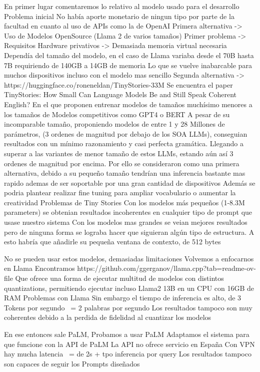 En primer lugar comentaremos lo relativo al modelo usado para el desarrollo
	Problema inicial
	No había aporte monetario de ningun tipo por parte de la facultad en cuanto al uso de APIs como la de OpenAI
	Primera alternativa -> Uso de Modelos OpenSource (Llama 2 de varios tamaños)
	Primer problema -> Requisitos Hardware privativos -> Demasiada memoria virtual necesaria
		Dependía del tamaño del modelo, en el caso de Llama variaba desde el 70B hasta 7B requiriendo de 140GB a 14GB de memoria 
		Lo que se vuelve inabarcable para muchos dispositivos incluso con el modelo mas sencillo
	Segunda alternativa -> https://huggingface.co/roneneldan/TinyStories-33M
		Se encuentra el paper TinyStories: How Small Can Language Models Be and Still Speak Coherent English?
		En el que proponen entrenar modelos de tamaños muchísimo menores a los tamaños de Modelos competitivos como GPT4 o BERT
		A pesar de su incomparable tamaño, proponiendo modelos de entre 1 y 28 Millones de parámetros, (3 ordenes de magnitud por debajo de los SOA LLMs), conseguian resultados con un mínimo razonamiento y casi perfecta gramática. Llegando a superar a las variantes de menor tamaño de estos LLMs, estando aún así 3 ordenes de magnitud por encima.
		Por ello se consideraron como una primera alternativa, debido a su pequeño tamaño tendrían una inferencia bastante mas rapido ademas de ser soportable por una gran cantidad de dispositivos
		Además se podria plantear realizar fine tuning para ampliar vocabulario o aumentar la creatividad
	Problemas de Tiny Stories
		Con los modelos más pequeños (1-8.3M parameters) se obtenian resultados incoherentes en cualquier tipo de prompt que usase nuestro sistema
		Con los modelos mas grandes se veian mejores resultados pero de ninguna forma se lograba hacer que siguieran algún tipo de estructura.
		A esto habría que añadirle su pequeña ventana de contexto, de 512 bytes
	
	No se pueden usar estos modelos, demasiadas limitaciones
	Volvemos a enfocarnos en Llama
		Encontramos https://github.com/ggerganov/llama.cpp?tab=readme-ov-file
		Que ofrece una forma de ejecutar multitud de modelos con distintos quantizations, permitiendo ejecutar incluso Llama2 13B en un CPU con 16GB de RAM
	Problemas con Llama
		Sin embargo el tiempo de inferencia es alto, de 3 Tokens por segundo ~= 2 palabras por segundo
		Los resultados tampoco son muy coherentes debido a la perdida de fidelidad al cuantizar los modelos

	En ese entonces sale PaLM, Probamos a usar PaLM
		Adaptamos el sistema para que funcione con la API de PaLM
		La API no ofrece servicio en España
		Con VPN hay mucha latencia ~= de 2s + tpo inferencia por query
		Los resultados tampoco son capaces de seguir los Prompts diseñados


